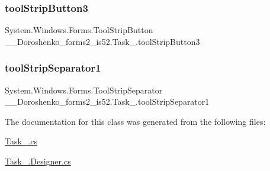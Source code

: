 \hypertarget{class__7___doroshenko__forms2__is52_1_1_task__4_af586497accc2f3831a9b90eaad5d062f}{}\label{class__7___doroshenko__forms2__is52_1_1_task__4_af586497accc2f3831a9b90eaad5d062f} 
\subsubsection{\texorpdfstring{tool\+Strip\+Button3}{toolStripButton3}}
{\footnotesize\ttfamily System.\+Windows.\+Forms.\+Tool\+Strip\+Button \+\_\+\_\+\+Doroshenko\+\_\+forms2\+\_\+is52.\+Task\+\_.\+tool\+Strip\+Button3\hspace{0.3cm}{\ttfamily [protected]}}

\hypertarget{class__7___doroshenko__forms2__is52_1_1_task__4_aaec220fabcd56417d4188ebbb1ee1ab6}{}\label{class__7___doroshenko__forms2__is52_1_1_task__4_aaec220fabcd56417d4188ebbb1ee1ab6} 
\subsubsection{\texorpdfstring{tool\+Strip\+Separator1}{toolStripSeparator1}}
{\footnotesize\ttfamily System.\+Windows.\+Forms.\+Tool\+Strip\+Separator \+\_\+\_\+\+Doroshenko\+\_\+forms2\+\_\+is52.\+Task\+\_.\+tool\+Strip\+Separator1\hspace{0.3cm}{\ttfamily [private]}}



The documentation for this class was generated from the following files\+:\begin{DoxyCompactItemize}
\item 
\hyperlink{_task__4_8cs}{Task\+\_.\+cs}\item 
\hyperlink{_task__4_8_designer_8cs}{Task\+\_.\+Designer.\+cs}\end{DoxyCompactItemize}
